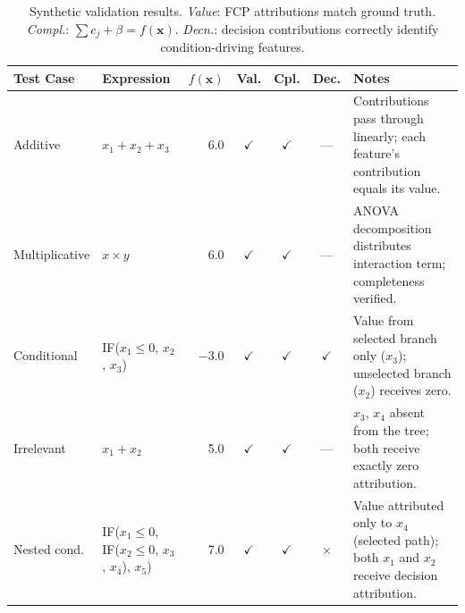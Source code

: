 \begin{table}[H]
  \centering
  \footnotesize
  \setlength{\tabcolsep}{4pt}
  \caption{Synthetic validation results. \emph{Value}: FCP attributions match ground truth. \emph{Compl.}: $\sum c_j + \beta = f(\mathbf{x})$. \emph{Decn.}: decision contributions correctly identify condition-driving features.}
  \label{tab:synthetic-validation}
  \begin{tabularx}{\textwidth}{@{}l l r c c c X@{}}
    \toprule
    \textbf{Test Case} & \textbf{Expression} & \textbf{$f(\mathbf{x})$} & \textbf{Val.} & \textbf{Cpl.} & \textbf{Dec.} & \textbf{Notes} \\
    \midrule
    Additive & $x_1 + x_2 + x_3$ & 6.0 & $\checkmark$ & $\checkmark$ & --- & Contributions pass through linearly; each feature's contribution equals its value. \\[3pt]
    Multiplicative & $x \times y$ & 6.0 & $\checkmark$ & $\checkmark$ & --- & ANOVA decomposition distributes interaction term; completeness verified. \\[3pt]
    Conditional & IF($x_1 \leq 0$, $x_2$, $x_3$) & $-3.0$ & $\checkmark$ & $\checkmark$ & $\checkmark$ & Value from selected branch only ($x_3$); unselected branch ($x_2$) receives zero. \\[3pt]
    Irrelevant & $x_1 + x_2$ & 5.0 & $\checkmark$ & $\checkmark$ & --- & $x_3$, $x_4$ absent from the tree; both receive exactly zero attribution. \\[3pt]
    Nested cond. & IF($x_1 \!\leq\! 0$, IF($x_2 \!\leq\! 0$, $x_3$, $x_4$), $x_5$) & 7.0 & $\checkmark$ & $\checkmark$ & $\times$ & Value attributed only to $x_4$ (selected path); both $x_1$ and $x_2$ receive decision attribution. \\
    \bottomrule
  \end{tabularx}
\end{table}